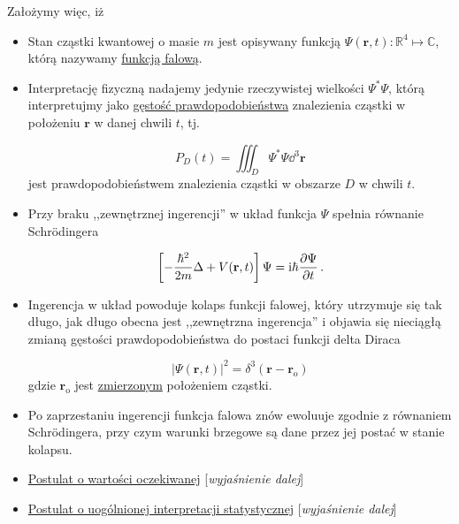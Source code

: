\documentclass{myclass}
\begin{document}
Założymy więc, iż
\begin{itemize}

    \item Stan cząstki kwantowej o masie \(m\) jest opisywany funkcją
    \(\Psi(\mathbf{r},t):\mathbb{R}^4\mapsto\mathbb{C}\), którą nazywamy \underline{funkcją falową}.

    \item Interpretację fizyczną nadajemy jedynie rzeczywistej wielkości \(\Psi^*\Psi\), którą
    interpretujmy jako \underline{gęstość prawdopodobieństwa} znalezienia cząstki w położeniu
    \(\mathbf{r}\) w danej chwili \(t\), tj.
    
    \begin{equation*}
        P_D(t)=\iiint_D\Psi^*\Psi\dd{^3\mathbf{r}}
    \end{equation*}
    jest prawdopodobieństwem znalezienia cząstki w obszarze \(D\) w chwili \(t\).

    \item Przy braku ,,zewnętrznej ingerencji'' w układ funkcja \(\Psi\) spełnia równanie
    Schr{\"o}dingera

    \begin{equation*}
        \left[-\frac{\hbar^2}{2m}\Delta+V(\mathbf{r},t)\right]\Psi=\mathrm{i}\hbar\pdv{\Psi}{t}\,.
    \end{equation*}

    \item Ingerencja w układ powoduje kolaps funkcji falowej, który utrzymuje się tak długo, jak
    długo obecna jest ,,zewnętrzna ingerencja'' i objawia się nieciągłą zmianą gęstości
    prawdopodobieństwa do postaci funkcji delta Diraca

    \begin{equation*}
        |\Psi(\mathbf{r},t)|^2=\delta^3(\mathbf{r}-\mathbf{r}_\text{o})
    \end{equation*}
    gdzie \(\mathbf{r}_\text{o}\) jest \underline{zmierzonym} położeniem cząstki.

    \item Po zaprzestaniu ingerencji funkcja falowa znów ewoluuje zgodnie z równaniem
    Schr{\"o}dingera, przy czym warunki brzegowe są dane przez jej postać w stanie kolapsu.

    \item \hyperref[postulat1]{Postulat o wartości oczekiwanej} [\textit{wyjaśnienie dalej}]

    \item \hyperref[postulat2]{Postulat o uogólnionej interpretacji statystycznej}
    [\textit{wyjaśnienie dalej}]

\end{itemize}
\end{document}
